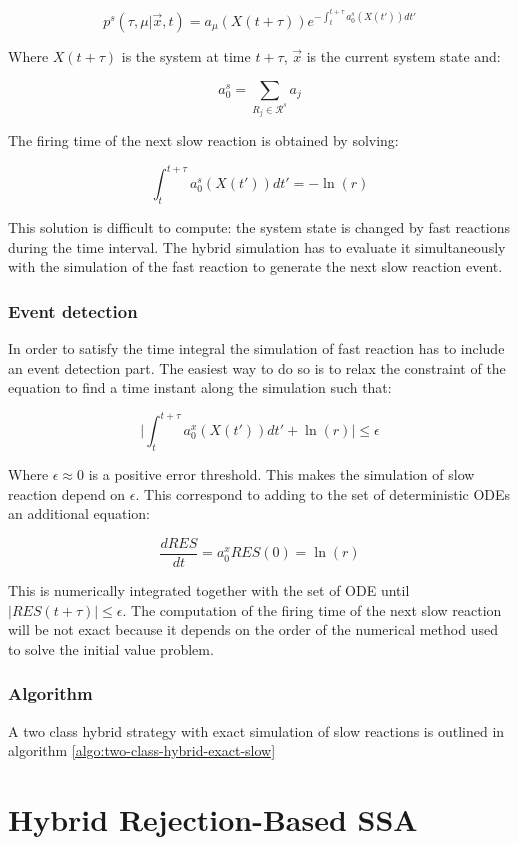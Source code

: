   $$p^s(\tau, \mu|\vec{x}, t) = a_\mu(X(t+\tau))e^{-\int_t^{t+\tau}a_0^s(X(t'))dt'}$$

  Where $X(t+\tau)$ is the system at time $t+\tau$, $\vec{x}$ is the current system state and:

  $$a_0^s = \sum\limits_{R_j\in\mathcal{R}^s}a_j$$

  The firing time of the next slow reaction is obtained by solving:

  $$\int_t^{t+\tau} a_0^s(X(t'))dt' = -\ln(r)$$

  This solution is difficult to compute: the system state is changed by fast reactions during the time interval.
  The hybrid simulation has to evaluate it simultaneously with the simulation of the fast reaction to generate the next slow reaction event.

    \subsubsection{Event detection}
    In order to satisfy the time integral the simulation of fast reaction has to include an event detection part.
    The easiest way to do so is to relax the constraint of the equation to find a time instant along the simulation such that:

    $$\biggr\vert\int_t^{t+\tau}a_0^x(X(t'))dt' + \ln(r)\biggr\vert\le\epsilon$$

    Where $\epsilon\approx 0$ is a positive error threshold.
    This makes the simulation of slow reaction depend on $\epsilon$.
    This correspond to adding to the set of deterministic ODEs an additional equation:

    $$\frac{dRES}{dt} = a_0^xRES(0) = \ln(r)$$

    This is numerically integrated together with the set of ODE until $|RES(t+\tau)|\le\epsilon$.
    The computation of the firing time of the next slow reaction will be not exact because it depends on the order of the numerical method used to solve the initial value problem.

    \subsubsection{Algorithm}
    A two class hybrid strategy with exact simulation of slow reactions is outlined in algorithm \ref{algo:two-class-hybrid-exact-slow}

    

\section{Hybrid Rejection-Based SSA}




